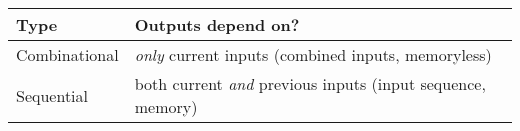 \begin{tabular}[h]{lp{7cm}}
  \hline
  Type & Outputs depend on?  \\
  \hline
  Combinational & \emph{only} current inputs (combined inputs, memoryless)  \\
  Sequential & both current \emph{and} previous inputs (input sequence, memory) \\
  \hline
\end{tabular}
